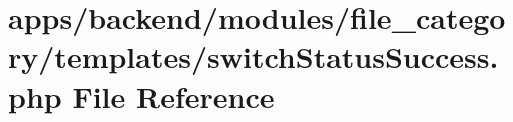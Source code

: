 \hypertarget{file__category_2templates_2switch_status_success_8php}{\section{apps/backend/modules/file\-\_\-category/templates/switch\-Status\-Success.php File Reference}
\label{file__category_2templates_2switch_status_success_8php}
}
